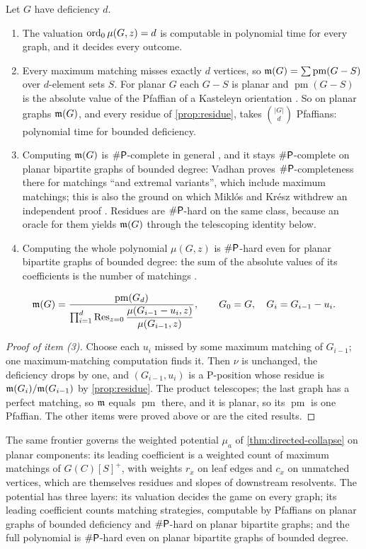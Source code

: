 \begin{theorem}\label{thm:kasteleyn}
Let $G$ have deficiency $d$.
\begin{enumerate}[label=\textup{(\arabic*)}]
\item The valuation $\operatorname{ord}_0\mu(G,z)=d$ is computable in polynomial time for every graph, and it decides every outcome.
\item Every maximum matching misses exactly $d$ vertices, so $\mathfrak{m}(G)=\sum\operatorname{pm}(G-S)$ over $d$-element sets $S$. For planar $G$ each $G-S$ is planar and $\operatorname{pm}(G-S)$ is the absolute value of the Pfaffian of a Kasteleyn orientation \cite{TemperleyFisher,Kasteleyn}. So on planar graphs $\mathfrak{m}(G)$, and every residue of \cref{prop:residue}, takes $\binom{|G|}{d}$ Pfaffians: polynomial time for bounded deficiency.
\item Computing $\mathfrak{m}(G)$ is $\#\mathsf{P}$-complete in general \cite{Valiant}, and it stays $\#\mathsf{P}$-complete on planar bipartite graphs of bounded degree: Vadhan \cite{Vadhan} proves $\#\mathsf{P}$-completeness there for matchings ``and extremal variants'', which include maximum matchings; this is also the ground on which Mikl\'os and Kr\'esz withdrew an independent proof \cite{MiklosKresz}. Residues are $\#\mathsf{P}$-hard on the same class, because an oracle for them yields $\mathfrak{m}(G)$ through the telescoping identity below.
\item Computing the whole polynomial $\mu(G,z)$ is $\#\mathsf{P}$-hard even for planar bipartite graphs of bounded degree: the sum of the absolute values of its coefficients is the number of matchings \cite{Jerrum,Vadhan}.
\end{enumerate}
\[
\mathfrak{m}(G)=\frac{\operatorname{pm}(G_d)}{\prod_{i=1}^{d}\operatorname{Res}_{z=0}\dfrac{\mu(G_{i-1}-u_i,z)}{\mu(G_{i-1},z)}},\qquad G_0=G,\quad G_i=G_{i-1}-u_i.
\]
\end{theorem}
\begin{proof}[Proof of item \textup{(3)}]
Choose each $u_i$ missed by some maximum matching of $G_{i-1}$; one maximum-matching computation finds it. Then $\nu$ is unchanged, the deficiency drops by one, and $(G_{i-1},u_i)$ is a P-position whose residue is $\mathfrak{m}(G_i)/\mathfrak{m}(G_{i-1})$ by \cref{prop:residue}. The product telescopes; the last graph has a perfect matching, so $\mathfrak{m}$ equals $\operatorname{pm}$ there, and it is planar, so its $\operatorname{pm}$ is one Pfaffian. The other items were proved above or are the cited results.
\end{proof}

The same frontier governs the weighted potential $\mu_a$ of \cref{thm:directed-collapse} on planar components: its leading coefficient is a weighted count of maximum matchings of $G(C)[S]^{+}$, with weights $r_x$ on leaf edges and $c_x$ on unmatched vertices, which are themselves residues and slopes of downstream resolvents. The potential has three layers: its valuation decides the game on every graph; its leading coefficient counts matching strategies, computable by Pfaffians on planar graphs of bounded deficiency and $\#\mathsf{P}$-hard on planar bipartite graphs; and the full polynomial is $\#\mathsf{P}$-hard even on planar bipartite graphs of bounded degree.

